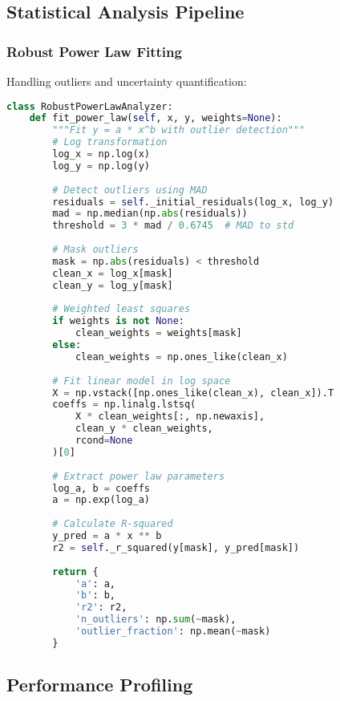 \documentclass[conference]{IEEEtran}
\begin{document}
\subsection{Statistical Analysis Pipeline}

\subsubsection{Robust Power Law Fitting}

Handling outliers and uncertainty quantification:

\begin{lstlisting}[language=Python, basicstyle=\small]
class RobustPowerLawAnalyzer:
    def fit_power_law(self, x, y, weights=None):
        """Fit y = a * x^b with outlier detection"""
        # Log transformation
        log_x = np.log(x)
        log_y = np.log(y)
        
        # Detect outliers using MAD
        residuals = self._initial_residuals(log_x, log_y)
        mad = np.median(np.abs(residuals))
        threshold = 3 * mad / 0.6745  # MAD to std
        
        # Mask outliers
        mask = np.abs(residuals) < threshold
        clean_x = log_x[mask]
        clean_y = log_y[mask]
        
        # Weighted least squares
        if weights is not None:
            clean_weights = weights[mask]
        else:
            clean_weights = np.ones_like(clean_x)
        
        # Fit linear model in log space
        X = np.vstack([np.ones_like(clean_x), clean_x]).T
        coeffs = np.linalg.lstsq(
            X * clean_weights[:, np.newaxis],
            clean_y * clean_weights,
            rcond=None
        )[0]
        
        # Extract power law parameters
        log_a, b = coeffs
        a = np.exp(log_a)
        
        # Calculate R-squared
        y_pred = a * x ** b
        r2 = self._r_squared(y[mask], y_pred[mask])
        
        return {
            'a': a,
            'b': b,
            'r2': r2,
            'n_outliers': np.sum(~mask),
            'outlier_fraction': np.mean(~mask)
        }
\end{lstlisting}

\subsection{Performance Profiling}
\end{document}
